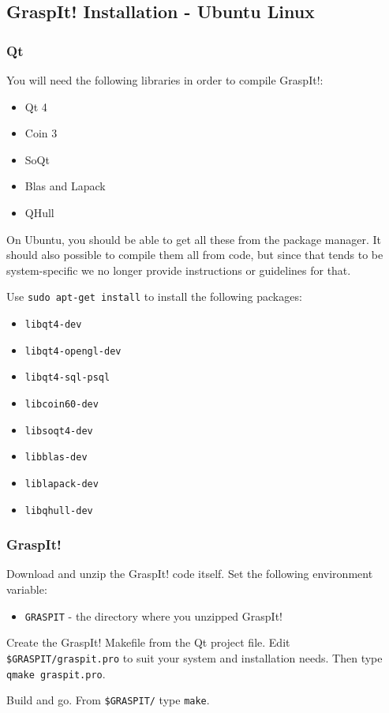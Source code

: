 \subsection{GraspIt! Installation - Ubuntu Linux}

\subsubsection{Qt}

You will need the following libraries in order to compile GraspIt!:
\begin{itemize}
\item Qt 4
\item Coin 3
\item SoQt
\item Blas and Lapack
\item QHull
\end{itemize}

On Ubuntu, you should be able to get all these from the package
manager. It should also possible to compile them all from code, but
since that tends to be system-specific we no longer provide
instructions or guidelines for that.

Use \texttt{sudo apt-get install} to install the following packages:
\begin{itemize}
\item \texttt{libqt4-dev}
\item \texttt{libqt4-opengl-dev}
\item \texttt{libqt4-sql-psql}
\item \texttt{libcoin60-dev}
\item \texttt{libsoqt4-dev}
\item \texttt{libblas-dev}
\item \texttt{liblapack-dev}
\item \texttt{libqhull-dev}
\end{itemize}

\subsubsection{GraspIt!}

Download and unzip the GraspIt! code itself. Set the following
environment variable:

\begin{itemize}
\item \texttt{GRASPIT} - the directory where you unzipped GraspIt!
\end{itemize}

Create the GraspIt! Makefile from the Qt project file. Edit
\texttt{\$GRASPIT/graspit.pro} to suit your system and
installation needs. Then type \texttt{qmake graspit.pro}.

Build and go. From \texttt{\$GRASPIT/} type \texttt{make}.
